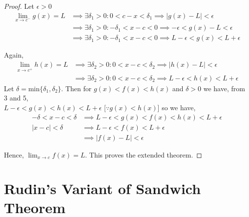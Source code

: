 \documentclass[a4paper,twoside,12pt]{article}
\theoremstyle{plain}
\theoremstyle{definition}
\begin{document}
 \begin{proof}

 Let \(\epsilon > 0\)
 \begin{align}
   \lim_{x \to c^-} g(x) = L & \implies \exists {\delta}_1 >0 : 0<c-x< \delta_1 \implies |g(x)-L|< \epsilon \\
                             &\implies \exists {\delta}_1 >0 : -\delta_1 <x-c< 0 \implies -\epsilon < g(x)-L< \epsilon \\
   &\implies \exists {\delta}_1 >0 : -\delta_1 <x-c< 0 \implies L -\epsilon < g(x)< L  + \epsilon
 \end{align}

 Again,
 \begin{align}
   \lim_{x \to c^+} h(x) =L & \implies \exists {\delta}_2 >0 : 0<x-c<\delta_2 \implies |h(x)-L|< \epsilon \\
   & \implies \exists {\delta}_2 >0 : 0<x-c<\delta_2 \implies L -\epsilon < h(x)< L  + \epsilon
 \end{align}
 Let \(\delta = \text{min}\{\delta_1, \delta_2\}\). Then for \(g(x) < f(x) < h(x)\) and \(\delta >0\) we have, from 3 and 5, \\
 \(L -\epsilon < g(x) < h(x)< L  + \epsilon \) [\(\because g(x) < h(x)\)] so we have,
 \begin{align}
-\delta < x-c < \delta & \implies   L -\epsilon < g(x) < f(x) < h(x)< L  + \epsilon \\
  |x-c| < \delta & \implies L -\epsilon < f(x)< L  + \epsilon \\
   & \implies |f(x) -L| < \epsilon
 \end{align}

 Hence, $\displaystyle \lim_{x \to c} f(x)=L$. This proves the extended theorem.
\end{proof}

\section{Rudin's Variant of Sandwich Theorem}
\end{document}
